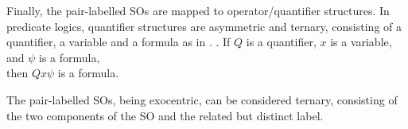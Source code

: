 \documentclass[MilwayThesis]{subfiles}
\begin{document}
Finally, the pair-labelled SOs are mapped to operator/quantifier structures.
In predicate logics, quantifier structures are asymmetric and ternary, consisting of a quantifier, a variable and a formula as in \Next.
\ex. If $Q$ is a quantifier, $x$ is a variable, and $\psi$ is a formula,\\
then $Qx\psi$ is a formula.

The pair-labelled SOs, being exocentric, can be considered ternary, consisting of the two components of the SO and the related but distinct label.
\end{document}
